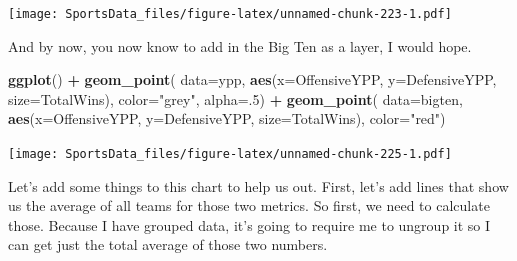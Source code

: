 \documentclass[
]{book}
\newenvironment{Shaded}{\begin{snugshade}}{\end{snugshade}}
\newcommand{\DataTypeTok}[1]{\textcolor[rgb]{0.13,0.29,0.53}{#1}}
\newcommand{\DecValTok}[1]{\textcolor[rgb]{0.00,0.00,0.81}{#1}}
\newcommand{\KeywordTok}[1]{\textcolor[rgb]{0.13,0.29,0.53}{\textbf{#1}}}
\newcommand{\NormalTok}[1]{#1}
\newcommand{\OperatorTok}[1]{\textcolor[rgb]{0.81,0.36,0.00}{\textbf{#1}}}
\newcommand{\StringTok}[1]{\textcolor[rgb]{0.31,0.60,0.02}{#1}}
\begin{document}
\texttt{[image: SportsData\_files/figure-latex/unnamed-chunk-223-1.pdf]}

And by now, you now know to add in the Big Ten as a layer, I would hope.

\begin{Shaded}
\end{Shaded}

\begin{Shaded}
\begin{Highlighting}[]
\KeywordTok{ggplot}\NormalTok{() }\OperatorTok{+}\StringTok{ }
\StringTok{  }\KeywordTok{geom_point}\NormalTok{(}
    \DataTypeTok{data=}\NormalTok{ypp, }
    \KeywordTok{aes}\NormalTok{(}\DataTypeTok{x=}\NormalTok{OffensiveYPP, }\DataTypeTok{y=}\NormalTok{DefensiveYPP, }\DataTypeTok{size=}\NormalTok{TotalWins), }
    \DataTypeTok{color=}\StringTok{"grey"}\NormalTok{, }
    \DataTypeTok{alpha=}\NormalTok{.}\DecValTok{5}\NormalTok{) }\OperatorTok{+}\StringTok{ }
\StringTok{  }\KeywordTok{geom_point}\NormalTok{(}
    \DataTypeTok{data=}\NormalTok{bigten, }
    \KeywordTok{aes}\NormalTok{(}\DataTypeTok{x=}\NormalTok{OffensiveYPP, }\DataTypeTok{y=}\NormalTok{DefensiveYPP, }\DataTypeTok{size=}\NormalTok{TotalWins), }
    \DataTypeTok{color=}\StringTok{"red"}\NormalTok{)}
\end{Highlighting}
\end{Shaded}

\texttt{[image: SportsData\_files/figure-latex/unnamed-chunk-225-1.pdf]}

Let's add some things to this chart to help us out. First, let's add lines that show us the average of all teams for those two metrics. So first, we need to calculate those. Because I have grouped data, it's going to require me to ungroup it so I can get just the total average of those two numbers.

\begin{Shaded}
\end{Shaded}
\end{document}
